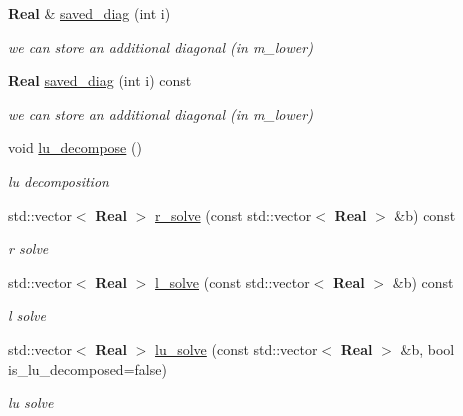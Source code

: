 \begin{DoxyCompactItemize}
\mbox{\label{classband__matrix_ab810540005fc4a28650c1df42c94bb53}} 
\textbf{ Real} \& \hyperlink{classband__matrix_ab810540005fc4a28650c1df42c94bb53}{saved\+\_\+diag} (int i)
\begin{DoxyCompactList}\small\item\em we can store an additional diagonal (in m\+\_\+lower) \end{DoxyCompactList}\item 
\mbox{\label{classband__matrix_a04be7a6e304145e1f767c1ff46f17437}} 
\textbf{ Real} \hyperlink{classband__matrix_a04be7a6e304145e1f767c1ff46f17437}{saved\+\_\+diag} (int i) const
\begin{DoxyCompactList}\small\item\em we can store an additional diagonal (in m\+\_\+lower) \end{DoxyCompactList}\item 
\mbox{\label{classband__matrix_ac5e874f32b8256dc18e5722997f79792}} 
void \hyperlink{classband__matrix_ac5e874f32b8256dc18e5722997f79792}{lu\+\_\+decompose} ()
\begin{DoxyCompactList}\small\item\em lu decomposition \end{DoxyCompactList}\item 
\mbox{\label{classband__matrix_a7a0ce07700f70150ecc3a76d38be9f89}} 
std\+::vector$<$ \textbf{ Real} $>$ \hyperlink{classband__matrix_a7a0ce07700f70150ecc3a76d38be9f89}{r\+\_\+solve} (const std\+::vector$<$ \textbf{ Real} $>$ \&b) const
\begin{DoxyCompactList}\small\item\em r solve \end{DoxyCompactList}\item 
\mbox{\label{classband__matrix_ab4ea20ddd99472dff36812a9b5fd26d5}} 
std\+::vector$<$ \textbf{ Real} $>$ \hyperlink{classband__matrix_ab4ea20ddd99472dff36812a9b5fd26d5}{l\+\_\+solve} (const std\+::vector$<$ \textbf{ Real} $>$ \&b) const
\begin{DoxyCompactList}\small\item\em l solve \end{DoxyCompactList}\item 
\mbox{\label{classband__matrix_a7e7b28c210d76f3826dac2462ebdca48}} 
std\+::vector$<$ \textbf{ Real} $>$ \hyperlink{classband__matrix_a7e7b28c210d76f3826dac2462ebdca48}{lu\+\_\+solve} (const std\+::vector$<$ \textbf{ Real} $>$ \&b, bool is\+\_\+lu\+\_\+decomposed=false)
\begin{DoxyCompactList}\small\item\em lu solve \end{DoxyCompactList}\end{DoxyCompactItemize}


